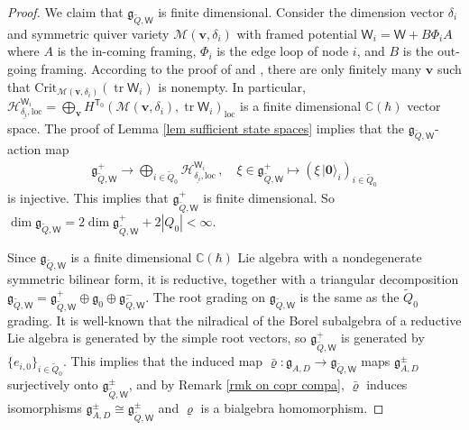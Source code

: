 \documentclass[10pt]{amsart}
\theoremstyle{definition}
\numberwithin{equation}{section}
\newcommand{\Crit}{\mathrm{Crit}}
\newcommand{\bC}{\mathbb{C}}
\newcommand{\bv}{\mathbf{v}}
\newcommand{\cH}{\mathcal{H}}
\newcommand{\cM}{\mathcal{M}}
\newcommand{\loc}{\mathrm{loc}}
\newcommand{\sT}{\mathsf{T}}
\newcommand{\sW}{\mathsf{W}}
\newcommand{\tr}{\operatorname{tr}}
\begin{document}
\begin{proof}
We claim that $\mathfrak{g}_{\widetilde{Q},\sW}$ is finite dimensional. Consider the dimension vector $\delta_i$ and symmetric quiver variety $\cM(\bv,\delta_i)$ with framed potential $\sW_i=\sW+B\Phi_iA$ where $A$ is the in-coming framing, $\Phi_i$ is the edge loop of node $i$, and $B$ is the out-going framing. According to the proof of \cite[Cor.~5.2]{VV3} and \cite[Rmk.~5.3]{VV3}, there are only finitely many $\bv$ such that $\Crit_{\cM(\bv,\delta_i)}(\tr\sW_i)$ is nonempty. In particular, $\cH^{\sW_i}_{\underline{\delta_i},\loc}=\bigoplus_{\bv}H^{\sT_0}(\cM(\bv,\delta_i),\tr\sW_i)_\loc$ is a finite dimensional $\bC(\hbar)$ vector space. The proof of Lemma \ref{lem sufficient state spaces} implies that the $\mathfrak{g}_{\widetilde{Q},\sW}$-action map
\begin{align*}
\mathfrak{g}_{\widetilde{Q},\sW}^+\to \bigoplus_{i\in \widetilde{Q}_0}\cH^{\sW_i}_{\underline{\delta_i},\loc}\,,\quad \xi\in \mathfrak{g}_{\widetilde{Q},\sW}^+\mapsto (\xi\,|\mathbf 0\rangle_i)_{i\in \widetilde{Q}_0}
\end{align*}
is injective. This implies that $\mathfrak{g}_{\widetilde{Q},\sW}^+$ is finite dimensional. So $\dim\mathfrak{g}_{\widetilde{Q},\sW}=2\dim \mathfrak{g}_{\widetilde{Q},\sW}^++2|Q_0|<\infty$.

Since $\mathfrak{g}_{\widetilde{Q},\sW}$ is a finite dimensional $\bC(\hbar)$ Lie algebra with a nondegenerate symmetric bilinear form, it is reductive, together with a triangular decomposition $\mathfrak{g}_{\widetilde{Q},\sW}=\mathfrak{g}_{\widetilde{Q},\sW}^+\oplus \mathfrak{g}_{0}\oplus \mathfrak{g}_{\widetilde{Q},\sW}^-$. The root grading on $\mathfrak{g}_{\widetilde{Q},\sW}$ is the same as the $\widetilde{Q}_0$ grading. It is well-known that the nilradical of the Borel subalgebra of a reductive Lie algebra is generated by the simple root vectors, so $\mathfrak{g}_{\widetilde{Q},\sW}^+$ is generated by $\{e_{i,0}\}_{i\in \widetilde{Q}_0}$. This implies that the induced map $\bar\varrho\colon \mathfrak{g}_{A,D}\to \mathfrak{g}_{\widetilde{Q},\sW}$ maps $\mathfrak{g}_{A,D}^{\pm}$ surjectively onto $\mathfrak{g}_{\widetilde{Q},\sW}^{\pm}$, and by Remark \ref{rmk on copr compa}, $\bar\varrho$ induces isomorphisms $\mathfrak{g}_{A,D}^{\pm}\cong\mathfrak{g}_{\widetilde{Q},\sW}^{\pm}$ and $\varrho$ is a bialgebra homomorphism.


\end{proof}
\end{document}
